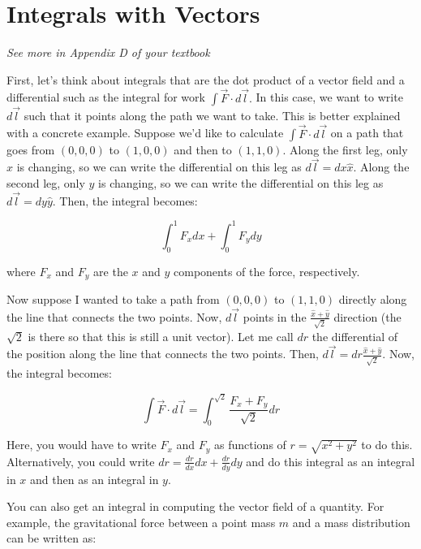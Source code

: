 \documentclass[12pt]{book}
\begin{document}
\pagebreak

\section{Integrals with Vectors}

{\it See more in Appendix D of your textbook}


\noindent First, let's think about integrals that are the dot product of a vector field and a differential such as the integral for work $\int \vec{F}\cdot d\vec{l}.$ In this case, we want to write $d\vec{l}$ such that it points along the path we want to take. This is better explained with a concrete example. Suppose we'd like to calculate $\int \vec{F}\cdot d\vec{l}$ on a path that goes from $(0,0,0)$ to $(1,0,0)$ and then to $(1,1,0).$ Along the first leg, only $x$ is changing, so we can write the differential on this leg as $d\vec{l} = dx \hat{x}.$ Along the second leg, only $y$ is changing, so we can write the differential on this leg as $d\vec{l} = dy \hat{y}.$ Then, the integral becomes:

\begin{equation*}
 \int_0^1 F_x dx+\int_0^1 F_y dy
\end{equation*}

\noindent where $F_x$ and $F_y$ are the $x$ and $y$ components of the force, respectively.

 Now suppose I wanted to take a path from $(0,0,0)$ to $(1,1,0)$ directly along the line that connects the two points. Now, $d\vec{l}$ points in the $\frac{\hat{x}+\hat{y}}{\sqrt{2}}$ direction (the $\sqrt{2}$ is there so that this is still a unit vector). Let me call $dr$ the differential of the position along the line that connects the two points. Then, $d\vec{l} = dr \frac{\hat{x}+\hat{y}}{\sqrt{2}}.$ Now, the integral becomes:

\begin{equation*}
 \int \vec{F}\cdot d\vec{l} = \int_0^{\sqrt{2}} \frac{F_x + F_y}{\sqrt{2}} dr
\end{equation*}

\noindent Here, you would have to write $F_x$ and $F_y$ as functions of $r=\sqrt{x^2+y^2}$ to do this. Alternatively, you could write $dr = \frac{dr}{dx} dx + \frac{dr}{dy} dy$ and do this integral as an integral in $x$ and then as an integral in $y.$

 You can also get an integral in computing the vector field of a quantity. For example, the gravitational force between a point mass $m$ and a mass distribution can be written as:
\end{document}
